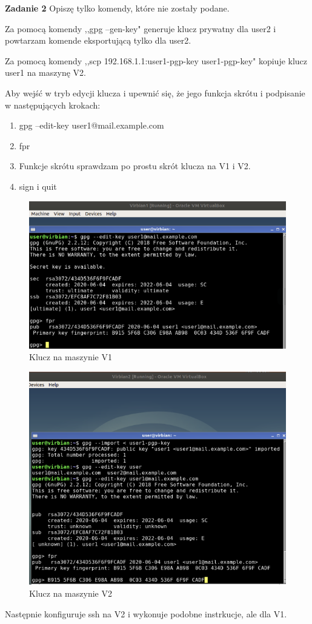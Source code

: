 \documentclass[12pt,a4paper]{article}
\newcommand{\zadanie}[1]{\par\textbf{Zadanie #1}}
\begin{document}
\zadanie{2} Opiszę tylko komendy, które nie zostały podane.

Za pomocą komendy ,,gpg --gen-key" generuje klucz prywatny dla user2 i powtarzam komende eksportującą tylko dla user2.

Za pomocą komendy ,,scp 192.168.1.1:user1-pgp-key user1-pgp-key" kopiuje klucz user1 na maszynę V2.

Aby wejść w tryb edycji klucza i upewnić się, że jego funkcja skrótu i podpisanie w następujących krokach:

\begin{enumerate}
\item gpg --edit-key user1@mail.example.com
\item fpr
\item Funkcje skrótu sprawdzam po prostu skrót klucza na V1 i V2.
\item sign i quit
\end{enumerate}
\begin{figure}[!htb]
\centering
\includegraphics[scale=0.4]{V1key.png}
\caption{Klucz na maszynie V1}
\end{figure}
\begin{figure}[!htb]
\centering
\includegraphics[scale=0.4]{V2key.png}
\caption{Klucz na maszynie V2}
\end{figure}
Następnie konfiguruje ssh na V2 i wykonuje podobne instrkucje, ale dla V1.
\end{document}
